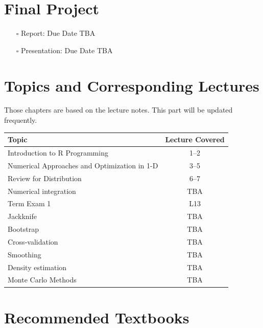 \documentclass[
  letterpaper,
  DIV=11,
  numbers=noendperiod]{scrreprt}
\providecommand{\tightlist}{%
  \setlength{\itemsep}{0pt}\setlength{\parskip}{0pt}}
\begin{document}
\section*{Final Project}\label{final-project}


\begin{itemize}
\tightlist
\item[$\square$]
  Report: Due Date TBA
\item[$\square$]
  Presentation: Due Date TBA
\end{itemize}

\section*{Topics and Corresponding
Lectures}\label{topics-and-corresponding-lectures}


Those chapters are based on the lecture notes. This part will be updated
frequently.

\begin{longtable}[]{@{}lc@{}}
\toprule\noalign{}
Topic & Lecture Covered \\
\midrule\noalign{}
\endhead
\bottomrule\noalign{}
\endlastfoot
Introduction to R Programming & 1--2 \\
Numerical Approaches and Optimization in 1-D & 3--5 \\
Review for Distribution & 6--7 \\
Numerical integration & TBA \\
Term Exam 1 & L13 \\
Jackknife & TBA \\
Bootstrap & TBA \\
Cross-validation & TBA \\
Smoothing & TBA \\
Density estimation & TBA \\
Monte Carlo Methods & TBA \\
\end{longtable}

\section*{Recommended Textbooks}\label{recommended-textbooks}
\end{document}
